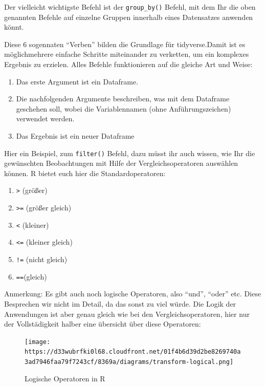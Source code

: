 \documentclass[
]{book}
\theoremstyle{definition}
\theoremstyle{definition}
\theoremstyle{definition}
\theoremstyle{definition}
\theoremstyle{remark}
\begin{document}
Der vielleicht wichtigste Befehl ist der \texttt{group\_by()} Befehl, mit dem Ihr die oben genannten Befehle auf einzelne Gruppen innerhalb eines Datensatzes anwenden könnt.

Diese 6 sogennaten ``Verben'' bilden die Grundlage für tidyverse.Damit ist es möglichmehrere einfache Schritte miteinander zu verketten, um ein komplexes Ergebnis zu erzielen. Alles Befehle funktionieren auf die gleiche Art und Weise:

\begin{enumerate}
\def\labelenumi{\arabic{enumi}.}
\item
  Das erste Argument ist ein Dataframe.
\item
  Die nachfolgenden Argumente beschreiben, was mit dem Dataframe geschehen soll, wobei die Variablennamen (ohne Anführungszeichen) verwendet werden.
\item
  Das Ergebnis ist ein neuer Dataframe
\end{enumerate}

Hier ein Beispiel, zum \texttt{filter()} Befehl, dazu müsst ihr auch wissen, wie Ihr die gewünschten Beobachtungen mit Hilfe der Vergleichsoperatoren auswählen können. R bietet euch hier die Standardoperatoren:

\begin{enumerate}
\def\labelenumi{\arabic{enumi}.}
\item
  \texttt{\textgreater{}} (größer)
\item
  \texttt{\textgreater{}=} (größer gleich)
\item
  \texttt{\textless{}} (kleiner)
\item
  \texttt{\textless{}=} (kleiner gleich)
\item
  \texttt{!=} (nicht gleich)
\item
  \texttt{==}(gleich)
\end{enumerate}

Anmerkung: Es gibt auch noch logische Operatoren, also ``und'', ``oder'' etc. Diese Besprechen wir nicht im Detail, da das sonst zu viel würde. Die Logik der Anwendungen ist aber genau gleich wie bei den Vergleichsoperatoren, hier nur der Vollstädigkeit halber eine übersicht über diese Operatoren:\\

\begin{figure}
\centering
\texttt{[image: https://d33wubrfki0l68.cloudfront.net/01f4b6d39d2be8269740a3ad7946faa79f7243cf/8369a/diagrams/transform-logical.png]}
\caption{Logische Operatoren in R}
\end{figure}
\end{document}
